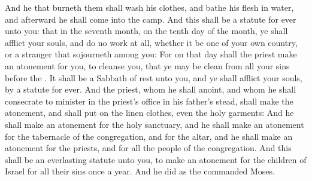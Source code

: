 \begin{biblechapter}
\verse And he that burneth them shall wash his clothes, and bathe his flesh in water, and afterward he shall come into the camp.
\verse And this shall be a statute for ever unto you: that in the seventh month, on the tenth day of the month, ye shall afflict your souls, and do no work at all, whether it be one of your own country, or a stranger that sojourneth among you:
\verse For on that day shall the priest make an atonement for you, to cleanse you, that ye may be clean from all your sins before the \LORD.
\verse It shall be a Sabbath of rest unto you, and ye shall afflict your souls, by a statute for ever.
\verse And the priest, whom he shall anoint, and whom he shall consecrate to minister in the priest's office in his father's stead, shall make the atonement, and shall put on the linen clothes, even the holy garments:
\verse And he shall make an atonement for the holy sanctuary, and he shall make an atonement for the tabernacle of the congregation, and for the altar, and he shall make an atonement for the priests, and for all the people of the congregation.
\verse And this shall be an everlasting statute unto you, to make an atonement for the children of Israel for all their sins once a year. And he did as the \LORD commanded Moses.
\end{biblechapter}

\flushcolsend %

